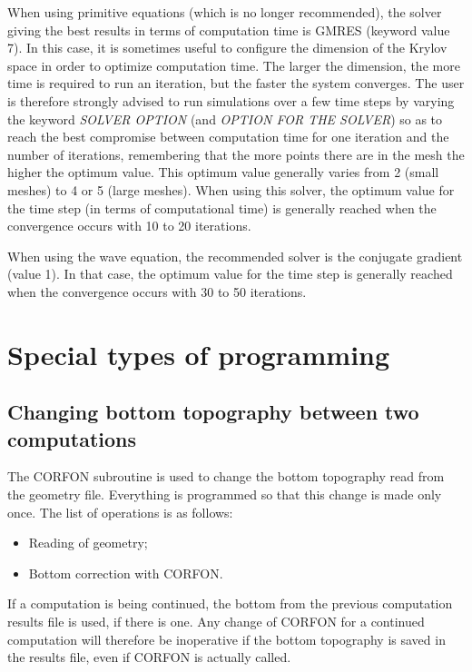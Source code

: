  When using primitive equations (which is no longer recommended), the solver giving the best results in terms of computation time is GMRES (keyword value 7). In this case, it is sometimes useful to configure the dimension of the Krylov space in order to optimize computation time. The larger the dimension, the more time is required to run an iteration, but the faster the system converges. The user is therefore strongly advised to run simulations over a few time steps by varying the keyword \textit{SOLVER OPTION} (and \textit{OPTION FOR THE SOLVER}) so as to reach the best compromise between computation time for one iteration and the number of iterations, remembering that the more points there are in the mesh the higher the optimum value. This optimum value generally varies from 2 (small meshes) to 4 or 5 (large meshes). When using this solver, the optimum value for the time step (in terms of computational time) is generally reached when the convergence occurs with 10 to 20 iterations.

 When using the wave equation, the recommended solver is the conjugate gradient (value 1). In that case, the optimum value for the time step is generally reached when the convergence occurs with 30 to 50 iterations.


\section{ Special types of programming}


\subsection{ Changing bottom topography between two computations}

 The CORFON subroutine is used to change the bottom topography read from the geometry file. Everything is programmed so that this change is made only once. The list of operations is as follows:
\begin{itemize}
\item Reading of geometry;

\item Bottom correction with CORFON.
\end{itemize}

If a computation is being continued, the bottom from the previous computation results file is used, if there is one.
Any change of CORFON for a continued computation will therefore be inoperative if the bottom topography is saved in the results file, even if CORFON is actually called.

